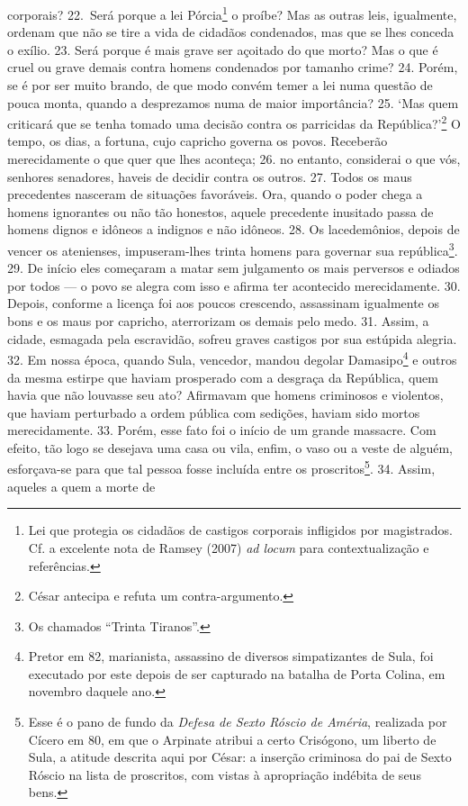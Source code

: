 corporais? 22.~Será porque a lei Pórcia\footnote{Lei  que protegia os cidadãos
de castigos corporais infligidos por magistrados. Cf. a excelente nota de
Ramsey (2007) \emph{ad locum} para contextualização e referências.} o proíbe?
Mas as outras leis, igualmente, ordenam que não se tire a vida de cidadãos
condenados, mas que se lhes conceda o exílio. 23. Será porque é mais grave ser
açoitado do que morto? Mas o que é cruel ou grave demais contra homens
condenados por tamanho crime? 24. Porém, se é por ser muito brando, de que modo
convém temer a lei numa questão de pouca monta, quando a desprezamos numa de
maior importância? 25. `Mas quem criticará que se tenha tomado uma decisão
contra os parricidas da República?'\footnote{César antecipa e refuta um
contra-argumento.} O tempo, os dias, a fortuna, cujo capricho governa os povos.
Receberão merecidamente o que quer que lhes aconteça; 26. no entanto,
considerai o que vós, senhores senadores, haveis de decidir contra os outros.
27. Todos os maus precedentes nasceram de situações favoráveis. Ora, quando o poder
chega a homens ignorantes ou não tão honestos, aquele precedente inusitado passa de
homens dignos e idôneos a indignos e não idôneos. 28. Os lacedemônios, depois
de vencer os atenienses, impuseram-lhes trinta homens para governar sua
república\footnote{Os chamados ``Trinta Tiranos''.}. 29. De início eles
começaram a matar sem julgamento os mais perversos e odiados por todos --- o povo
se alegra com isso e afirma ter acontecido merecidamente. 30. Depois, conforme
a licença foi aos poucos crescendo, assassinam igualmente os bons e os maus por
capricho, aterrorizam os demais pelo medo. 31. Assim, a cidade, esmagada pela
escravidão, sofreu graves castigos por sua estúpida alegria. 32. Em nossa
época, quando Sula, vencedor, mandou degolar Damasipo\footnote{Pretor em 82,
marianista, assassino de diversos simpatizantes de Sula, foi executado por este
depois de ser capturado na batalha de Porta Colina, em novembro daquele ano.} e
outros da mesma estirpe que haviam prosperado com a desgraça da República, quem
havia que não louvasse seu ato? Afirmavam que homens criminosos e violentos,
que haviam perturbado a ordem pública com sedições, haviam sido mortos
merecidamente. 33. Porém, esse fato foi o início de um grande massacre. Com
efeito, tão logo se desejava uma casa ou vila, enfim, o vaso ou a veste de
alguém, esforçava-se para que tal pessoa fosse incluída entre os
proscritos\footnote{Esse é o pano de fundo da \emph{Defesa de Sexto Róscio de
Améria}, realizada por Cícero em 80, em que o Arpinate atribui a certo
Crisógono, um liberto de Sula, a atitude descrita aqui por César: a inserção
criminosa do pai de Sexto Róscio na lista de proscritos, com vistas à
apropriação indébita de seus bens.}. 34. Assim, aqueles a quem a morte de
